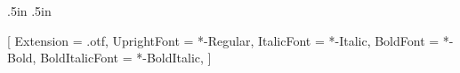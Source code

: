 
\usepackage{geometry}
\geometry{letterpaper, textwidth=6.5in, textheight=9.5in, marginparsep=20pt, marginparwidth=2in}
\setlength\parindent{0in}

\oddsidemargin .5in
\evensidemargin .5in

\usepackage{fancyhdr}
\pagestyle{plain}
\lfoot{\hspace{2.71in}\thepage}

\usepackage{fontspec}
\usepackage[usenames,dvipsnames]{color}
\usepackage{xunicode}
\usepackage{xltxtra}


\setmainfont[ExternalLocation=fonts/berkeley-mono/OTF/]{BerkeleyMono}[
Extension = .otf,
UprightFont = *-Regular,
ItalicFont = *-Italic,
BoldFont = *-Bold,
BoldItalicFont = *-BoldItalic,
]

\usepackage{marvosym} %
\usepackage{fontawesome5}

\usepackage{etoolbox}
\usepackage[group-separator={,}]{siunitx}
{}

\newcommand{\html}[1]{\href{#1}{\scriptsize\textsc{[html]}}}
\newcommand{\pdf}[1]{\href{#1}{\scriptsize\textsc{[pdf]}}}
\newcommand{\doi}[1]{\href{#1}{\scriptsize\textsc{[doi]}}}

\usepackage{marginnote}
\newcommand{\years}[1]{\marginnote{\normalsize #1}}
\renewcommand*{\raggedrightmarginnote}{}
\setlength{\marginparsep}{14pt}
\reversemarginpar

\usepackage{sectsty}
\usepackage[normalem]{ulem}
\sectionfont{\sffamily\scshape\large}
\subsectionfont{\mdseries\scshape\normalsize}
\subsubsectionfont{\mdseries\upshape\large}

